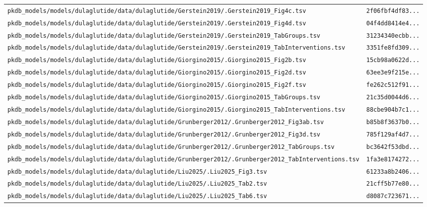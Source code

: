 \begin{longtable}{ll}
\texttt{pkdb\_models/models/dulaglutide/data/dulaglutide/Gerstein2019/.Gerstein2019\_Fig4c.tsv} & \texttt{2f06fbf4df83...} \\
\texttt{pkdb\_models/models/dulaglutide/data/dulaglutide/Gerstein2019/.Gerstein2019\_Fig4d.tsv} & \texttt{04f4dd8414e4...} \\
\texttt{pkdb\_models/models/dulaglutide/data/dulaglutide/Gerstein2019/.Gerstein2019\_TabGroups.tsv} & \texttt{31234340ecbb...} \\
\texttt{pkdb\_models/models/dulaglutide/data/dulaglutide/Gerstein2019/.Gerstein2019\_TabInterventions.tsv} & \texttt{3351fe8fd309...} \\
\texttt{pkdb\_models/models/dulaglutide/data/dulaglutide/Giorgino2015/.Giorgino2015\_Fig2b.tsv} & \texttt{15cb98a0622d...} \\
\texttt{pkdb\_models/models/dulaglutide/data/dulaglutide/Giorgino2015/.Giorgino2015\_Fig2d.tsv} & \texttt{63ee3e9f215e...} \\
\texttt{pkdb\_models/models/dulaglutide/data/dulaglutide/Giorgino2015/.Giorgino2015\_Fig2f.tsv} & \texttt{fe262c512f91...} \\
\texttt{pkdb\_models/models/dulaglutide/data/dulaglutide/Giorgino2015/.Giorgino2015\_TabGroups.tsv} & \texttt{21c35d0044d6...} \\
\texttt{pkdb\_models/models/dulaglutide/data/dulaglutide/Giorgino2015/.Giorgino2015\_TabInterventions.tsv} & \texttt{88cbe904b7c1...} \\
\texttt{pkdb\_models/models/dulaglutide/data/dulaglutide/Grunberger2012/.Grunberger2012\_Fig3ab.tsv} & \texttt{b85b8f3637b0...} \\
\texttt{pkdb\_models/models/dulaglutide/data/dulaglutide/Grunberger2012/.Grunberger2012\_Fig3d.tsv} & \texttt{785f129af4d7...} \\
\texttt{pkdb\_models/models/dulaglutide/data/dulaglutide/Grunberger2012/.Grunberger2012\_TabGroups.tsv} & \texttt{bc3642f53dbd...} \\
\texttt{pkdb\_models/models/dulaglutide/data/dulaglutide/Grunberger2012/.Grunberger2012\_TabInterventions.tsv} & \texttt{1fa3e8174272...} \\
\texttt{pkdb\_models/models/dulaglutide/data/dulaglutide/Liu2025/.Liu2025\_Fig3.tsv} & \texttt{61233a8b2406...} \\
\texttt{pkdb\_models/models/dulaglutide/data/dulaglutide/Liu2025/.Liu2025\_Tab2.tsv} & \texttt{21cff5b77e80...} \\
\texttt{pkdb\_models/models/dulaglutide/data/dulaglutide/Liu2025/.Liu2025\_Tab6.tsv} & \texttt{d8087c723671...} \\

\end{longtable}

